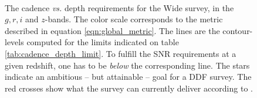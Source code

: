 \documentclass[\docopts]{\docclass}
\begin{document}
\begin{figure}
\begin{center}
\\
\caption{The cadence {\em vs.} depth requirements for the Wide survey,
  in the $g, r, i$ and $z$-bands. The color scale corresponds to the
  metric described in equation \ref{eqn:global_metric}.  The lines are
  the contour-levels computed for the limits indicated on table
  \ref{tab:cadence_depth_limit}. To fulfill the SNR requirements at a
  given redshift, one has to be {\em below} the corresponding
  line. The stars indicate an ambitious -- but attainable -- goal for
  a DDF survey.  The red crosses show what the survey can currently
  deliver according to .}
\label{fig:m5_cadence_limits_wide}
\end{center}
\end{figure}
\end{document}
